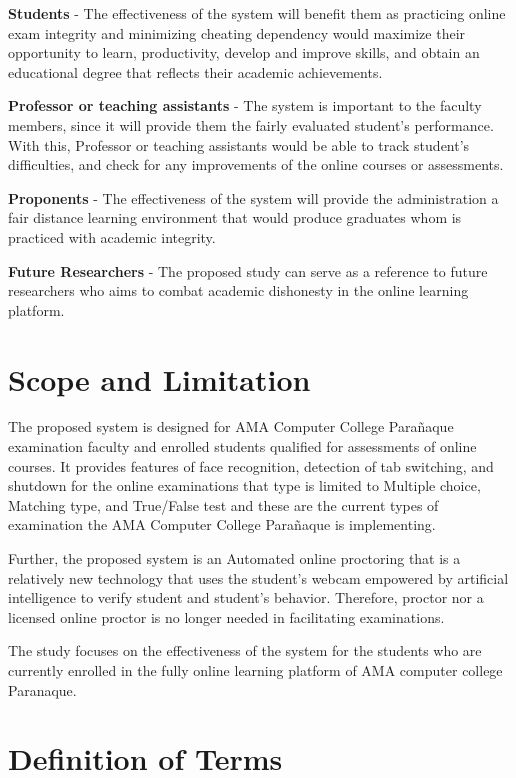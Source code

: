 \textbf{Students} - The effectiveness of the system will benefit them as practicing online exam integrity and minimizing cheating dependency would maximize their opportunity to learn, productivity, develop and improve skills, and obtain an educational degree that reflects their academic achievements.

\textbf{Professor or teaching assistants} - The system is important to the faculty members, since it will provide them the fairly evaluated student’s performance.
With this, Professor or teaching assistants would be able to track student’s difficulties, and check for any improvements of the online courses or assessments.

\textbf{Proponents} - The effectiveness of the system will provide the administration a fair distance learning environment that would produce graduates whom is practiced with academic integrity.

\textbf{Future Researchers} - The proposed study can serve as a reference to future researchers who aims to combat academic dishonesty in the online learning platform.

\section{Scope and Limitation}

The proposed system is designed for AMA Computer College Parañaque examination faculty and enrolled students qualified for assessments of online courses.
It provides features of face recognition, detection of tab switching, and shutdown for the online examinations that type is limited to Multiple choice, Matching type, and True/False test and these are the current types of examination the AMA Computer College Parañaque is implementing.

Further, the proposed system is an Automated online proctoring that is a relatively new technology that uses the student’s webcam empowered by artificial intelligence to verify student and student’s behavior.
Therefore, proctor nor a licensed online proctor is no longer needed in facilitating examinations.

The study focuses on the effectiveness of the system for the students who are currently enrolled in the fully online learning platform of AMA computer college Paranaque.

\section{Definition of Terms}

